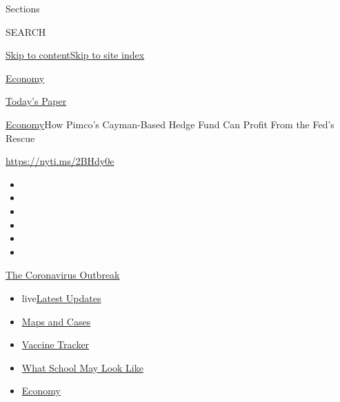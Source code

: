 Sections

SEARCH

\protect\hyperlink{site-content}{Skip to
content}\protect\hyperlink{site-index}{Skip to site index}

\href{https://www.nytimes.com/section/business/economy}{Economy}

\href{https://myaccount.nytimes.com/auth/login?response_type=cookie\&client_id=vi}{}

\href{https://www.nytimes.com/section/todayspaper}{Today's Paper}

\href{/section/business/economy}{Economy}\textbar{}How Pimco's
Cayman-Based Hedge Fund Can Profit From the Fed's Rescue

\url{https://nyti.ms/2BHdy0e}

\begin{itemize}
\item
\item
\item
\item
\item
\item
\end{itemize}

\href{https://www.nytimes.com/news-event/coronavirus?action=click\&pgtype=Article\&state=default\&region=TOP_BANNER\&context=storylines_menu}{The
Coronavirus Outbreak}

\begin{itemize}
\tightlist
\item
  live\href{https://www.nytimes.com/2020/08/01/world/coronavirus-covid-19.html?action=click\&pgtype=Article\&state=default\&region=TOP_BANNER\&context=storylines_menu}{Latest
  Updates}
\item
  \href{https://www.nytimes.com/interactive/2020/us/coronavirus-us-cases.html?action=click\&pgtype=Article\&state=default\&region=TOP_BANNER\&context=storylines_menu}{Maps
  and Cases}
\item
  \href{https://www.nytimes.com/interactive/2020/science/coronavirus-vaccine-tracker.html?action=click\&pgtype=Article\&state=default\&region=TOP_BANNER\&context=storylines_menu}{Vaccine
  Tracker}
\item
  \href{https://www.nytimes.com/interactive/2020/07/29/us/schools-reopening-coronavirus.html?action=click\&pgtype=Article\&state=default\&region=TOP_BANNER\&context=storylines_menu}{What
  School May Look Like}
\item
  \href{https://www.nytimes.com/live/2020/07/31/business/stock-market-today-coronavirus?action=click\&pgtype=Article\&state=default\&region=TOP_BANNER\&context=storylines_menu}{Economy}
\end{itemize}

